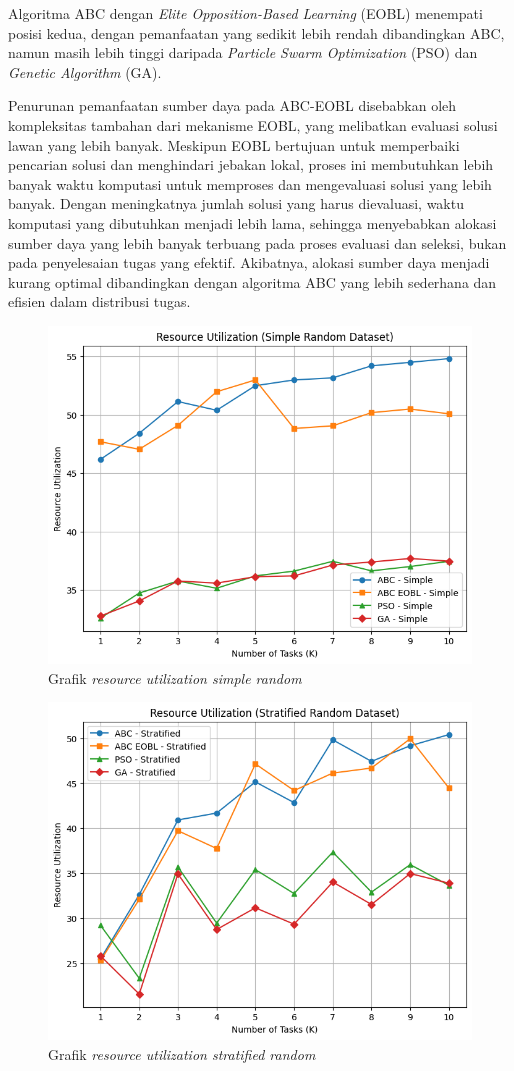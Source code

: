 Algoritma ABC dengan \textit{Elite Opposition-Based Learning} (EOBL) menempati posisi kedua, dengan pemanfaatan yang sedikit lebih rendah dibandingkan ABC, namun masih lebih tinggi daripada \textit{Particle Swarm Optimization} (PSO) dan \textit{Genetic Algorithm} (GA).

Penurunan pemanfaatan sumber daya pada ABC-EOBL disebabkan oleh kompleksitas tambahan dari mekanisme EOBL, yang melibatkan evaluasi solusi lawan yang lebih banyak. Meskipun EOBL bertujuan untuk memperbaiki pencarian solusi dan menghindari jebakan lokal, proses ini membutuhkan lebih banyak waktu komputasi untuk memproses dan mengevaluasi solusi yang lebih banyak. Dengan meningkatnya jumlah solusi yang harus dievaluasi, waktu komputasi yang dibutuhkan menjadi lebih lama, sehingga menyebabkan alokasi sumber daya yang lebih banyak terbuang pada proses evaluasi dan seleksi, bukan pada penyelesaian tugas yang efektif. Akibatnya, alokasi sumber daya menjadi kurang optimal dibandingkan dengan algoritma ABC yang lebih sederhana dan efisien dalam distribusi tugas.

\newpage

\begin{figure} [H]
    \centering
    \includegraphics[width=0.75\linewidth]{gambar/Grafik Resource Utilization Simple Random.png}
    \caption{Grafik \textit{resource utilization simple random}}
\end{figure}

\begin{figure} [H]
    \centering
    \includegraphics[width=0.75\linewidth]{gambar/Grafik Resource Utilization Stratified Random.png}
    \caption{Grafik \textit{resource utilization stratified random}}
\end{figure}

